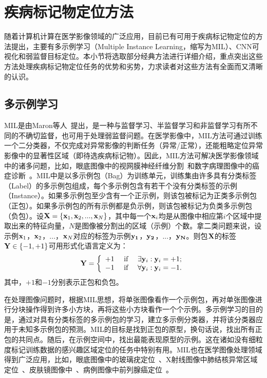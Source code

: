 \section{疾病标记物定位方法}\label{sec:related_work}
随着计算机计算在医学影像领域的广泛应用，目前已有可用于疾病标记物定位的方法提出，主要有多示例学习（Multiple Instance Learning，缩写为MIL）、CNN可视化和弱监督目标定位。本小节将选取部分经典方法进行详细介绍，重点突出这些方法处理疾病标记物定位任务的优势和劣势，力求读者对这些方法有全面而又清晰的认识。
\subsection{多示例学习}
MIL是由Maron等人~\cite{maron1998framework}提出，是一种与监督学习、半监督学习和非监督学习有所不同的不确切监督，也可用于处理弱监督问题。在医学影像中，MIL方法可通过训练一个二分类器，不仅完成对异常影像的判断任务（异常/正常），还能粗略定位异常影像中的显著性区域（即待选疾病标记物）。因此，MIL方法可解决医学影像领域中的诸多问题，比如，眼底图像中的视网膜神经纤维分割~\cite{manivannan2017subcategory}和数字病理图像中的癌症诊断~\cite{kandemir2014empowering}。MIL中是以多示例包（Bag）为训练单元，训练集由许多具有分类标签（Label）的多示例包组成，每个多示例包含有若干个没有分类标签的示例（Instance）。如果多示例包至少含有一个正示例，则该包被标记为正类多示例包（正包）。如果多示例包的所有示例都是负示例，则该包被标记为负类多示例包（负包）。设$\mathbf{X}=\{\mathbf{x}_1,\mathbf{x}_2,...,\mathbf{x}_N\}$，其中每一个$\mathbf{x}_i$均是从图像中相应第$i$个区域中提取出来的特征向量，$N$是图像被分割出的区域（示例）个数。拿二类问题来说，设示例${\mathbf{x}_1}$，$\mathbf{x}_2$，...，$\mathbf{x}_N$对应的标签为示例$\mathbf{y_1}$，$\mathbf{y_2}$，...，$\mathbf{y_N}$。则包$\mathbf{X}$的标签$\mathbf{Y}\in \{-1,+1\}$可用形式化语言定义为：
\begin{equation*}
\mathbf{Y}=\left\{\begin{array}{ll}
{+1} & {\text { if } \quad \exists \mathbf{y}_{i}: \mathbf{y}_{i}=+1;} \\
{-1} & {\text { if } \quad \forall \mathbf{y}_{i}: \mathbf{y}_{i}=-1.}
\end{array}\right.
\end{equation*}
其中，$+1$和$-1$分别表示正包和负包。

在处理图像问题时，根据MIL思想，将单张图像看作一个示例包，再对单张图像进行分块操作得到许多小方块，再将这些小方块看作一个个示例。多示例学习的目的是，通过对具有分类标签的多示例包的学习，建立多示例分类器，并将该分类器应用于未知多示例包的预测。MIL的目标是找到正包的原型，换句话说，找出所有正包的共同点。随后，在示例空间中，找出最能表现原型的示例。这在诸如没有细粒度标记训练数据的感兴趣区域定位的任务中特别有用。MIL也在医学图像处理领域得到广泛应用，比如，眼底图像中的玻璃疣定位~\cite{lu2015effective}、X射线图像中肺结核异常区域定位~\cite{melendez2014novel}、皮肤镜图像中~\cite{madooei2018learning}、病例图像中前列腺癌定位~\cite{campanella2018terabyte}。

